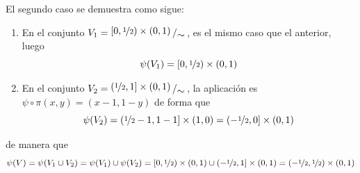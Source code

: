 \begin{ejer}
\begin{enumerate}
\begin{sol}
            El segundo caso se demuestra como sigue:
            \begin{enumerate}
                \item En el conjunto $V_1=\modulo{[0,\nicefrac{1}{2}) \times (0,1)}{\sim}$, es el mismo caso que el anterior, luego 
                $$\psi(V_1) = [0,\nicefrac{1}{2}) \times (0,1)$$
                \item En el conjunto $V_2=\modulo{(\nicefrac{1}{2},1] \times (0,1)}{\sim}$, la aplicaci\'on es $\psi\circ \pi(x,y) = (x-1,1-y)$ de forma que 
                $$\psi(V_2)=(\nicefrac{1}{2}-1,1-1] \times (1,0) = (-\nicefrac{1}{2},0] \times (0,1)$$
            \end{enumerate} 
            de manera que
            $$\psi(V) = \psi(V_1 \cup V_2) = \psi(V_1) \cup \psi(V_2) = [0,\nicefrac{1}{2}) \times (0,1) \cup (-\nicefrac{1}{2},1] \times (0,1) =(-\nicefrac{1}{2},\nicefrac{1}{2}) \times (0,1)$$


\end{sol}
\end{enumerate}
\end{ejer}
